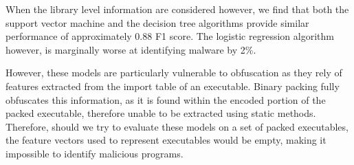 \documentclass[conference,compsoc]{IEEEtran}
\begin{document}
When the library level information are considered however, we find that both the support vector machine and the decision tree algorithms provide similar performance of approximately 0.88 F1 score. The logistic regression algorithm however, is marginally worse at identifying malware by 2\%. 

However, these models are particularly vulnerable to obfuscation as they rely of features extracted from the import table of an executable. Binary packing fully obfuscates this information, as it is found within the encoded portion of the packed executable, therefore unable to be extracted using static methods. Therefore, should we try to evaluate these models on a set of packed executables, the feature vectors used to represent executables would be empty, making it impossible to identify malicious programs. 




\end{document}
